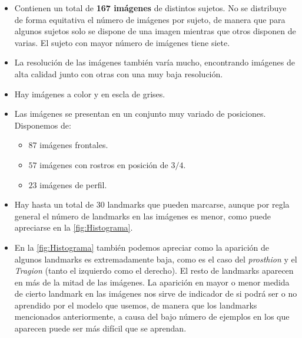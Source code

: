             \begin{itemize}
                \item Contienen un total de \textbf{167 imágenes} de distintos sujetos. No se distribuye de forma equitativa el número de imágenes por sujeto, de manera que para algunos sujetos solo se dispone de una imagen mientras que otros disponen de varias. El sujeto con mayor número de imágenes tiene siete.
                \item La resolución de las imágenes también varía mucho, encontrando imágenes de alta calidad junto con otras con una muy baja resolución.
                \item Hay imágenes a color y en escla de grises.
                \item Las imágenes se presentan en un conjunto muy variado de posiciones. Disponemos de: 
                \begin{itemize}
                    \item $87$ imágenes frontales.
                    \item $57$ imágenes con rostros en posición de $3/4$.
                    \item $23$ imágenes de perfil.
                \end{itemize}
                \item Hay hasta un total de $30$ landmarks que pueden marcarse, aunque por regla general el número de landmarks en las imágenes es menor, como puede apreciarse en la \autoref{fig:Histograma}.
                \item En la \autoref{fig:Histograma} también podemos apreciar como la aparición de algunos landmarks es extremadamente baja, como es el caso del \textit{prosthion} y el \textit{Tragion} (tanto el izquierdo como el derecho). El resto de landmarks aparecen en más de la mitad de las imágenes. 
                \medskip
                \noindent La aparición en mayor o menor medida de cierto landmark en las imágenes nos sirve de indicador de si podrá ser o no aprendido por el modelo que usemos, de manera que los landmarks mencionados anteriormente, a causa del bajo número de ejemplos en los que aparecen puede ser más difícil que se aprendan.
            \end{itemize}


